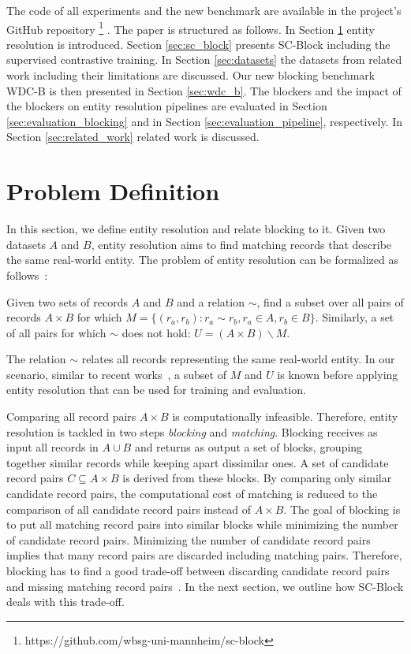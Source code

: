 \documentclass[sigconf,nonacm]{acmart}
\begin{document}
The code of all experiments and the new benchmark are available in the project's GitHub repository
\footnote{https://github.com/wbsg-uni-mannheim/sc-block}
.
The paper is structured as follows. In Section \ref{sec:problem_definition} entity resolution is introduced. Section \ref{sec:sc_block} presents SC-Block including the supervised contrastive training. In Section \ref{sec:datasets} the datasets from related work including their limitations are discussed. Our new blocking benchmark WDC-B is then presented in Section \ref{sec:wdc_b}. The blockers and the impact of the blockers on entity resolution pipelines are evaluated in Section \ref{sec:evaluation_blocking} and in Section \ref{sec:evaluation_pipeline}, respectively. In Section \ref{sec:related_work} related work is discussed.
 

\section{Problem Definition}
\label{sec:problem_definition}




In this section, we define entity resolution and relate blocking to it. Given two datasets $A$ and $B$, entity resolution aims to find matching records 
that describe the same real-world entity.
The problem of entity resolution can be formalized as follows~\cite{fellegi_theory_1969}:
\begin{definition}
  Given two sets of records $A$ and $B$ and a relation $\sim$, find a subset over all pairs of records $A\times B$ for which $M = \{(r_a,r_b): r_a \sim r_b, r_a \in A, r_b \in B\}$. Similarly, a set of all pairs for which $\sim$ does not hold:
  $U=(A\times B) \backslash M$.
\end{definition}

The relation $\sim$ relates all records representing the same real-world entity. In our scenario, similar to recent works~\cite{zhang_autoblock_2020,papadakis_supervised_2014,thirumuruganathan_deep_2021}, a subset of $M$ and $U$ is known before applying entity resolution that can be used for training and evaluation.

Comparing all record pairs $A\times B$ is computationally infeasible. Therefore, entity resolution is tackled in two steps \emph{blocking} and \emph{matching}. Blocking receives as input all records in $A \cup B$ and returns as output a set of blocks, grouping together similar records while keeping apart dissimilar ones. A set of candidate record pairs $C\subseteq A\times B$ is derived from these blocks. By comparing only similar candidate record pairs, the computational cost of matching is reduced to the comparison of all candidate record pairs instead of $A\times B$. The goal of blocking is to put all matching record pairs into similar blocks while minimizing the number of candidate record pairs. Minimizing the number of candidate record pairs implies that many record pairs are discarded including matching pairs. Therefore, blocking has to find a good trade-off between discarding candidate record pairs and missing matching record pairs~\cite{christophides_overview_2021, christen_data_2012}. In the next section, we outline how SC-Block deals with this trade-off.
\end{document}
